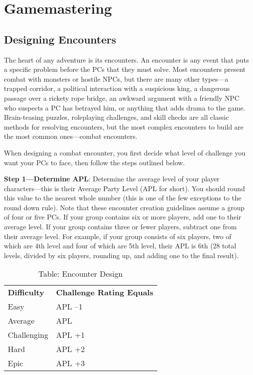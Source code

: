 \chapter{Gamemastering}
\section{Designing Encounters}

\label{f0}				
The heart of any adventure is its encounters. An encounter is any event that puts a specific problem before the PCs that they must solve. Most encounters present combat with monsters or hostile NPCs, but there are many other types---a trapped corridor, a political interaction with a suspicious king, a dangerous passage over a rickety rope bridge, an awkward argument with a friendly NPC who suspects a PC has betrayed him, or anything that adds drama to the game. Brain-teasing puzzles, roleplaying challenges, and skill checks are all classic methods for resolving encounters, but the most complex encounters to build are the most common ones---combat encounters.
				
When designing a combat encounter, you first decide what level of challenge you want your PCs to face, then follow the steps outlined below.
				
\textbf{Step 1---Determine APL}: Determine the average level of your player characters---this is their Average Party Level (APL for short). 
You should round this value to the nearest whole number (this is one of the few exceptions to the round down rule).
Note that these encounter creation guidelines assume a group of four or five PCs. If your group contains six or more players,
add one to their average level. If your group contains three or fewer players, subtract one from their average level. 
For example, if your group consists of six players, two of which are 4th level and four of which are 5th level, their
APL is 6th (28 total levels, divided by six players, rounding up, and adding one to the final result). \\

\begin{table}[]
\sffamily
\caption{Table: Encounter Design}
\begin{tabular}{ll}
\textbf{Difficulty} & \textbf{Challenge Rating Equals}\\
Easy & APL --1 \\
 Average & APL \\
 Challenging & APL +1 \\
 Hard & APL +2 \\
 Epic & APL +3 \\
\end{tabular}
\end{table}

